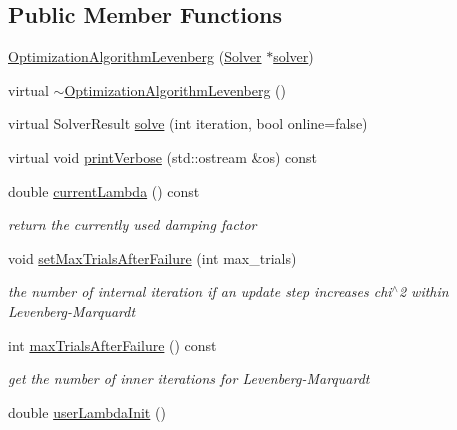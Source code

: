 \subsection*{Public Member Functions}
\begin{DoxyCompactItemize}
\item 
\mbox{\hyperlink{classg2o_1_1_optimization_algorithm_levenberg_aecdac695d6406eb2234bbd8a0c4d53a3}{Optimization\+Algorithm\+Levenberg}} (\mbox{\hyperlink{classg2o_1_1_solver}{Solver}} $\ast$\mbox{\hyperlink{classg2o_1_1_optimization_algorithm_with_hessian_a85473a4073c76b1a52cf9cf175e31c45}{solver}})
\item 
virtual \mbox{\hyperlink{classg2o_1_1_optimization_algorithm_levenberg_a926c821217c53b10fec9275b6fa5e548}{$\sim$\+Optimization\+Algorithm\+Levenberg}} ()
\item 
virtual Solver\+Result \mbox{\hyperlink{classg2o_1_1_optimization_algorithm_levenberg_a7140fa989b54eac4e09ba17829dcada0}{solve}} (int iteration, bool online=false)
\item 
virtual void \mbox{\hyperlink{classg2o_1_1_optimization_algorithm_levenberg_a67308ead9762f478e29385229ea4b138}{print\+Verbose}} (std\+::ostream \&os) const
\item 
double \mbox{\hyperlink{classg2o_1_1_optimization_algorithm_levenberg_afa4684ccfb8b87e85d0102cbe412f105}{current\+Lambda}} () const
\begin{DoxyCompactList}\small\item\em return the currently used damping factor \end{DoxyCompactList}\item 
void \mbox{\hyperlink{classg2o_1_1_optimization_algorithm_levenberg_a0fd2212e456428e44ddac693f6d27ac8}{set\+Max\+Trials\+After\+Failure}} (int max\+\_\+trials)
\begin{DoxyCompactList}\small\item\em the number of internal iteration if an update step increases chi$^\wedge$2 within Levenberg-\/\+Marquardt \end{DoxyCompactList}\item 
int \mbox{\hyperlink{classg2o_1_1_optimization_algorithm_levenberg_a5d467a866c6ee90aaed9b4ccaf29e5e5}{max\+Trials\+After\+Failure}} () const
\begin{DoxyCompactList}\small\item\em get the number of inner iterations for Levenberg-\/\+Marquardt \end{DoxyCompactList}\item 
double \mbox{\hyperlink{classg2o_1_1_optimization_algorithm_levenberg_a4a4d18c98361a1288db724136d353596}{user\+Lambda\+Init}} ()

\end{DoxyCompactItemize}

